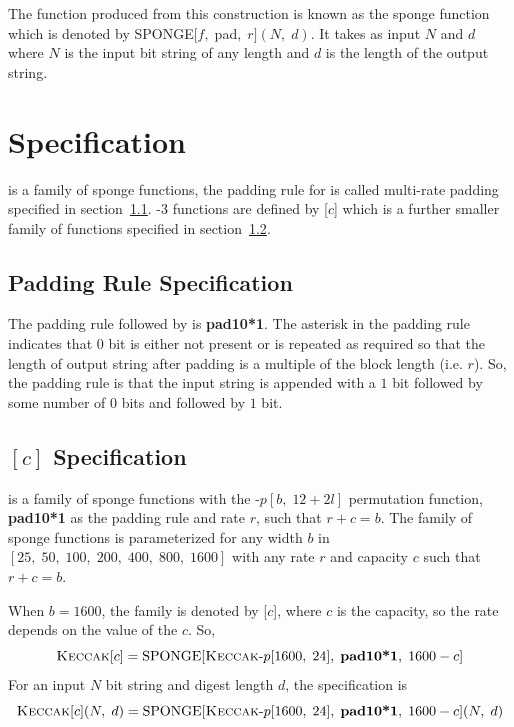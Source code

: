 The function produced from this construction is known as the sponge function which is denoted by SPONGE$[f,\; $pad$,\; r](N,\; d)$. It takes as input $N$ and $d$ where $N$ is the input bit string of any length and $d$ is the length of the output string.

\section{\KECCAK{} Specification}

\KECCAK{} is a family of sponge functions, the padding rule for \KECCAK{} is called multi-rate padding specified in section~\ref{padding}. \SHA-$3$ functions are defined by \KECCAK{}[$c$] which is a further smaller family of \KECCAK{} functions specified in section~\ref{keccakc}.

\subsection{Padding Rule Specification}
\label{padding}

The padding rule followed by \KECCAK{} is \textbf{pad10*1}. The asterisk in the padding rule indicates that $0$ bit is either not present or is repeated as required so that the length of output string after padding is a multiple of the block length (i.e. $r$). So, the padding rule is that the input string is appended with a $1$ bit followed by some number of $0$ bits and followed by $1$ bit.

\subsection{\KECCAK{}$[c]$ Specification}
\label{keccakc}

\KECCAK{} is a family of sponge functions with the \KECCAK{}-$p[b,\; 12 + 2l]$ permutation function, \textbf{pad10*1} as the padding rule and rate $r$, such that $r + c = b$. The family of sponge functions is parameterized for any width $b$ in $[25,\;50,\;100,\;200,\;400,\;800,\;1600]$ with any rate $r$ and capacity $c$ such that $r + c = b$.

When $b = 1600$, the \KECCAK{} family is denoted by \KECCAK{}[$c$], where $c$ is the capacity, so the rate depends on the value of the $c$. So, 
\[\mbox{\textsc{Keccak}}{}[c] = \text{SPONGE}[\mbox{\textsc{Keccak}}{}\text{-}p[1600,\;24],\;\textbf{pad10*1},\;1600-c]\]
For an input $N$ bit string and digest length $d$, the specification is 
\[\mbox{\textsc{Keccak}}{}[c](N,\; d) = \text{SPONGE}[\mbox{\textsc{Keccak}}{}\text{-}p[1600,\; 24],\; \textbf{pad10*1},\; 1600-c](N,\; d)\]
